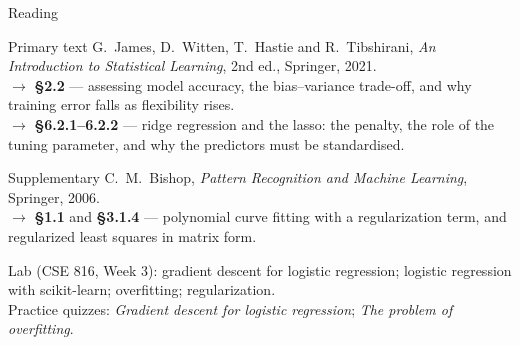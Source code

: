 \documentclass[aspectratio=169,10pt]{beamer}
\begin{document}
\begin{frame}{Reading}
  \begin{block}{Primary text}
    G.~James, D.~Witten, T.~Hastie and R.~Tibshirani,
    \emph{An Introduction to Statistical Learning}, 2nd ed., Springer, 2021.\\[2pt]
    \hfill{\small$\rightarrow$ \textbf{\S2.2} --- assessing model accuracy, the
    bias--variance trade-off, and why training error falls as flexibility rises.}\\[2pt]
    \hfill{\small$\rightarrow$ \textbf{\S6.2.1--6.2.2} --- ridge regression and the lasso:
    the penalty, the role of the tuning parameter, and why the predictors must be
    standardised.}
  \end{block}
  \begin{block}{Supplementary}
    C.~M.~Bishop, \emph{Pattern Recognition and Machine Learning}, Springer, 2006.\\[2pt]
    \hfill{\small$\rightarrow$ \textbf{\S1.1} and \textbf{\S3.1.4} --- polynomial curve
    fitting with a regularization term, and regularized least squares in matrix form.}
  \end{block}
  \vspace{1mm}
  \begin{center}
    \small\color{cugray}
    Lab (CSE 816, Week 3): gradient descent for logistic regression; logistic regression with
    scikit-learn; overfitting; regularization.\\
    Practice quizzes: \emph{Gradient descent for logistic regression}; \emph{The problem of
    overfitting}.
  \end{center}
\end{frame}
\end{document}
